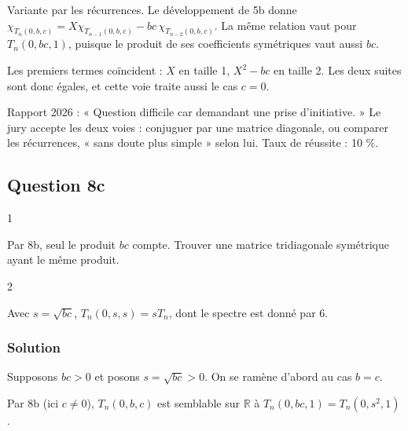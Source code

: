 \documentclass[11pt,a4paper]{article}
\begin{document}
\begin{methode}

Variante par les récurrences. Le développement de 5b donne \(\chi_{T_n(0,b,c)}=X\chi_{T_{n-1}(0,b,c)}-bc\,\chi_{T_{n-2}(0,b,c)}\). La même relation vaut pour \(T_n(0,bc,1)\), puisque le produit de ses coefficients symétriques vaut aussi \(bc\).

Les premiers termes coïncident : \(X\) en taille 1, \(X^2-bc\) en taille 2. Les deux suites sont donc égales, et cette voie traite aussi le cas \(c=0\).

\end{methode}

\begin{jury}

Rapport 2026 : « Question difficile car demandant une prise d'initiative. » Le jury accepte les deux voies : conjuguer par une matrice diagonale, ou comparer les récurrences, « sans doute plus simple » selon lui. Taux de réussite : 10 \%.

\end{jury}

\hypertarget{question-8c}{%
\subsection{Question 8c}\label{question-8c}}

\begin{indication}{1}

Par 8b, seul le produit \(bc\) compte. Trouver une matrice tridiagonale symétrique ayant le même produit.

\end{indication}

\begin{indication}{2}

Avec \(s=\sqrt{bc}\), \(T_n(0,s,s)=sT_n\), dont le spectre est donné par 6.

\end{indication}

\hypertarget{solution-15}{%
\subsubsection{Solution}\label{solution-15}}

Supposons \(bc>0\) et posons \(s=\sqrt{bc}>0\). On se ramène d'abord au cas \(b=c\).

Par 8b (ici \(c\neq0\)), \(T_n(0,b,c)\) est semblable sur \(\mathbb R\) à \(T_n(0,bc,1)=T_n(0,s^2,1)\).
\end{document}

